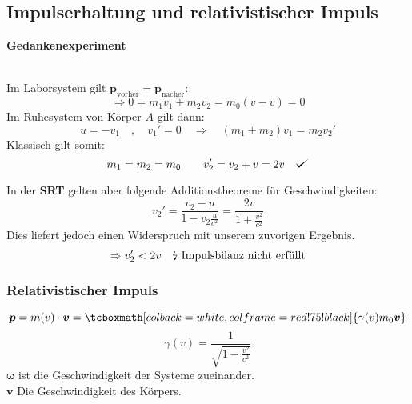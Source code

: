 \documentclass[titlepage,11pt,a4paper,ngerman]{report}
\def\checkmark{\tikz\fill[scale=0.4](0,.35) -- (.25,0) -- (1,.7) -- (.25,.15) -- cycle;}
\newcommand{\tx}[1]{\textrm{#1}}
\renewcommand{\vec}[1]{\boldsymbol{#1}}
\newcommand{\rmbox}[1]{\tcboxmath[colback=white,colframe=red!75!black]{#1}}
\begin{document}
\subsection{Impulserhaltung und relativistischer Impuls}
\textbf{Gedankenexperiment}\\[5pt]
\\
Im Laborsystem gilt $ \vec{p}_{\tx{vorher}} = \vec{p}_{\tx{nacher}} $:
\begin{equation*}
\Rightarrow 0 = m_1 v_1 + m_2 v_2 = m_0 (v-v) = 0
\end{equation*}
Im Ruhesystem von Körper $ A $ gilt dann:
\begin{equation*}
u = - v_1 \quad , \quad v_1' = 0
\quad
\Rightarrow \quad (m_1 + m_2) v_1 = m_2 v_2'
\end{equation*}
Klassisch gilt somit:
\begin{equation*}
m_1 = m_2 = m_0
\qquad
v_2' = v_2 + v = 2v \quad \checkmark
\end{equation*}

In der \textbf{SRT} gelten aber folgende Additionstheoreme für Geschwindigkeiten:
\begin{equation*}
v_2' = \frac{v_2 - u}{1 - v_2 \frac{u}{c^2}} = \frac{2 v}{1 + \frac{v^2}{c^2}}
\end{equation*}
Dies liefert jedoch einen Widerspruch mit unserem zuvorigen Ergebnis.
\begin{equation*}
\Rightarrow v_2' < 2v \quad \tx{\lightning\ Impulsbilanz nicht erfüllt}
\end{equation*}

\subsubsection{Relativistischer Impuls}
\begin{equation*}
\vec{p} = m(v) \cdot \vec{v} = \rmbox{\gamma(v) m_0 \vec{v}}
\end{equation*}
\begin{equation*}
\gamma(v) = \frac{1}{\sqrt{1 - \frac{v^2}{c^2}}}
\end{equation*}
$ \vec{\omega} $ ist die Geschwindigkeit der Systeme zueinander.\\
$ \vec{v} $ Die Geschwindigkeit des Körpers.
\end{document}
